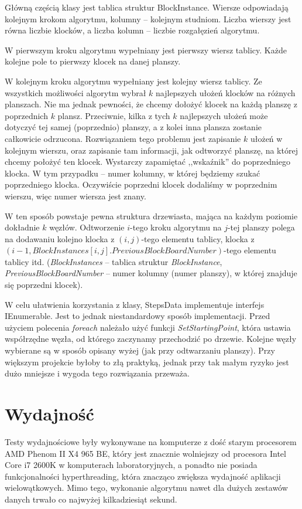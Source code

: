 \documentclass{article}
\begin{document}
Główną częścią klasy jest tablica struktur BlockInstance. Wiersze odpowiadają kolejnym krokom algorytmu, kolumny -- kolejnym studniom. Liczba wierszy jest równa liczbie klocków, a liczba kolumn -- liczbie rozgałęzień algorytmu.

W pierwszym kroku algorytmu wypełniany jest pierwszy wiersz tablicy. Każde kolejne pole to pierwszy klocek na danej planszy.

W kolejnym kroku algorytmu wypełniany jest kolejny wiersz tablicy. Ze wszystkich możliwości algorytm wybrał $k$ najlepszych ułożeń klocków na różnych planszach. Nie ma jednak pewności, że chcemy dołożyć klocek na każdą planszę z poprzednich $k$ plansz. Przeciwnie, kilka z tych $k$ najlepszych ułożeń może dotyczyć tej samej (poprzednio) planszy, a z kolei inna plansza zostanie całkowicie odrzucona. Rozwiązaniem tego problemu jest zapisanie $k$ ułożeń w kolejnym wierszu, oraz zapisanie tam informacji, jak odtworzyć planszę, na której chcemy położyć ten klocek. Wystarczy zapamiętać ,,wskaźnik'' do poprzedniego klocka. W tym przypadku -- numer kolumny, w której będziemy szukać poprzedniego klocka. Oczywiście poprzedni klocek dodaliśmy w poprzednim wierszu, więc numer wiersza jest znany.

W ten sposób powstaje pewna struktura drzewiasta, mająca na każdym poziomie dokładnie $k$ węzłów. Odtworzenie $i$-tego kroku algorytmu na $j$-tej planszy polega na dodawaniu kolejno klocka z $(i, j)$-tego elementu tablicy, klocka z $(i-1, BlockInstances[i, j].PreviousBlockBoardNumber)$-tego elementu tablicy itd. (\textit{BlockInstances} -- tablica struktur \textit{BlockInstance}, \textit{PreviousBlockBoardNumber} -- numer kolumny (numer planszy), w której znajduje się poprzedni klocek).

W celu ułatwienia korzystania z klasy, StepsData implementuje interfejs IEnumerable. Jest to jednak niestandardowy sposób implementacji. Przed użyciem polecenia \textit{foreach} należało użyć funkcji \textit{SetStartingPoint}, która ustawia współrzędne węzła, od którego zaczynamy przechodzić po drzewie. Kolejne węzły wybierane są w sposób opisany wyżej (jak przy odtwarzaniu planszy). Przy większym projekcie byłoby to złą praktyką, jednak przy tak małym ryzyko jest dużo mniejsze i wygoda tego rozwiązania przeważa.



\clearpage
\section{Wydajność}
Testy wydajnościowe były wykonywane na komputerze z dość starym procesorem AMD Phenom II X4 965 BE, który jest znacznie wolniejszy od procesora Intel Core i7 2600K w komputerach laboratoryjnych, a ponadto nie posiada funkcjonalności hyperthreading, która znacząco zwiększa wydajność aplikacji wielowątkowych. Mimo tego, wykonanie algorytmu nawet dla dużych zestawów danych trwało co najwyżej kilkadziesiąt sekund.
\end{document}
